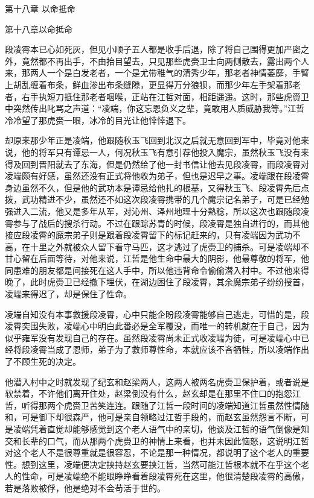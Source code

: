 第十八章    以命抵命

第十八章以命抵命

段凌霄本已心如死灰，但见小顺子五人都是收手后退，除了将自己围得更加严密之外，竟然都不再出手，不由抬目望去，只见那些虎赍卫士向两侧散去，露出两个人来，那两人一个是白发老者，一个是尤带稚气的清秀少年，那老者神情萎靡，手臂上胡乱缠着布条，鲜血渗出布条缝隙，更显得万分狼狈，而那少年左手架着那老者，右手执短刀抵住那老者咽喉，正站在江哲对面，相距遥遥。这时，那些虎赍卫中突然传出叱骂之声道：“凌端，你这忘恩负义之辈，竟敢用人质威胁我等。”江哲冷冷望了那虎赍一眼，冰冷的目光让他悻悻退下。

却原来那少年正是凌端，他跟随秋玉飞回到北汉之后就无意回到军中，毕竟对他来说，他的将军只有谭忌一人，何况秋玉飞有意引荐他投入魔宗，虽然秋玉飞没有来得及回到晋阳就去了东海，但是仍然给了他一封书信让他去见段凌霄，而段凌霄对凌端颇有好感，虽然还没有正式将他收为弟子，但也是迟早之事。凌端跟在段凌霄身边虽然不久，但是他的武功本是谭忌给他扎的根基，又得秋玉飞、段凌霄先后点拨，武功精进不少，虽然还不如这次段凌霄携带的几个魔宗记名弟子，可是已经勉强进入二流，他又是多年从军，对沁州、泽州地理十分熟稔，所以这次也跟随段凌霄参与了战后的搜杀行动。不过在跟踪苏青的时候，段凌霄是独自进行的，而其他接应段凌霄的魔宗弟子则是跟着段凌霄留下的标记赶来的，只有凌端因为武功不高，在十里之外就被众人留下看守马匹，这才逃过了虎赍卫的捕杀。可是凌端却不甘心留在后面等待，对他来说，江哲是他生命中最大的阴影，他最尊敬的将军，他同患难的朋友都是间接死在这人手中，所以他违背命令偷偷潜入村中。不过他来得晚了，此时虎赍卫已经撤下埋伏，在湖边困住了段凌霄，其余魔宗弟子纷纷授首，凌端来得迟了，却是保住了性命。

凌端自知没有本事救援段凌霄，心中只能企盼段凌霄能够自己逃走，可惜的是，段凌霄突围失败，凌端心中明白此番必是全军覆没，而唯一的转机就在于自己，因为似乎雍军没有发现自己的存在。虽然段凌霄尚未正式收凌端为徒，可是凌端心中已经将段凌霄当成了恩师，弟子为了救师尊性命，本就应该不吝牺牲，所以凌端作出了不顾生死的决定。

他潜入村中之时就发现了纪玄和赵梁两人，这两人被两名虎赍卫保护着，或者说是软禁着，不许他们离开住处，赵梁倒没有什么，赵玄却是在那里不住口的抱怨江哲，听得那两个虎赍卫苦笑连连。跟随了江哲一段时间的凌端知道江哲虽然性情随和，可是御下却很森严，他可是亲自领略过江哲手段的，而赵玄虽然怨言不断，可是凌端凭着直觉却能够感觉到这个老人语气中的亲切，他谈及江哲的语气倒像是知交和长辈的口气，而从那两个虎赍卫的神情上来看，也并未因此恼怒，这说明江哲对这个老人不是很尊重就是很容忍，不论是那一种情况，都说明了这个老人的重要性。想到这里，凌端便决定挟持赵玄要挟江哲，当然可能江哲根本就不在乎这个老人的性命，可是凌端绝不能眼睁睁看着段凌霄死在这里，他很清楚段凌霄的高傲，若是落败被俘，他是绝对不会苟活于世的。

